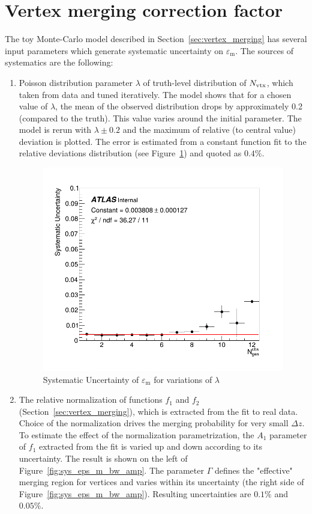 \section{Vertex merging correction factor}
The toy Monte-Carlo model described in Section~\ref{sec:vertex_merging} has several input parameters which generate systematic uncertainty on $\varepsilon_\text{m}$. The sources of systematics are the following:
\begin{enumerate}
    \item Poisson distribution parameter $\lambda$ of truth-level distribution of $N_\text{vtx}$, which taken from data and tuned iteratively. The model shows that for a chosen value of $\lambda$, the mean of the observed distribution drops by approximately 0.2 (compared to the truth). This value varies around the initial parameter. The model is rerun with $\lambda\pm0.2$ and the maximum of relative (to central value) deviation is plotted. The error is estimated from a constant function fit to the relative deviations distribution (see Figure~\ref{fig:sys_eps_m_nvtx}) and quoted as $0.4\%$.
    \begin{figure}[h]
        \centering
        \includegraphics[width=0.5\linewidth]{images/sys_unc_mean_vtx.png}
        \caption{Systematic Uncertainty of $\varepsilon_\text{m}$ for variations of $\lambda$}
        \label{fig:sys_eps_m_nvtx}
    \end{figure}
    \item The relative normalization of functions $f_1$ and $f_2$ (Section~\ref{sec:vertex_merging}), which is extracted from the fit to real data. Choice of the normalization drives the merging probability for very small $\Delta z$. To estimate the effect of the normalization parametrization, the $A_1$ parameter of $f_1$ extracted from the fit is varied up and down according to its uncertainty. The result is shown on the left of Figure~\ref{fig:sys_eps_m_bw_amp}. The parameter $\Gamma$ defines the "effective" merging region for vertices and varies within its uncertainty (the right side of Figure~\ref{fig:sys_eps_m_bw_amp}). Resulting uncertainties are $0.1\%$ and $0.05\%$.

\end{enumerate}
